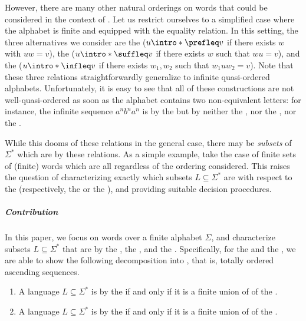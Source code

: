 \AP However, there are many other natural orderings on words that could be
considered in the context of . Let us restrict
ourselves to a simplified case where the alphabet is finite and equipped with
the equality relation. In this setting, the three alternatives we consider are
the  ($u \intro*\prefleq v$ if there exists $w$ with $uw
= v$), the  ($u \intro*\suffleq v$ if there exists $w$
such that $wu = v$), and the  ($u \intro*\infleq v$ if
there exists $w_1,w_2$ such that $w_1 u w_2 = v$). Note that these three
relations straightforwardly generalize to infinite quasi-ordered alphabets.
Unfortunately, it is easy to see that all of these constructions are not
well-quasi-ordered as soon as the alphabet contains two non-equivalent letters:
for instance, the infinite sequence $a^n b^n a^n$ is  by
the  but by neither the , nor the
, nor the .

\AP While this dooms  of these relations in the general case, there may be
\emph{subsets} of $\Sigma^*$ which are  by these
relations. As a simple example, take the case of finite sets of (finite) words
which are all  regardless of the ordering considered.
This raises the question of characterizing exactly which subsets $L \subseteq \Sigma^*$
are  with respect to the 
(respectively, the  or the ), and
providing suitable decision procedures.



\subparagraph{Contribution} In this paper, we focus on words over a finite
alphabet $\Sigma$, and characterize subsets $L \subseteq \Sigma^*$ that are
 by the , the ,
and the . Specifically, for the  and the , we are able to show the following decomposition into , that is, totally ordered ascending sequences.

{
\renewcommand{\labelenumi}{R\arabic{enumi}}
\begin{enumerate}
	\item A language $L \subseteq \Sigma^*$ is  by the  if and only if it is a finite union of  of the .
	\item A language $L \subseteq \Sigma^*$ is  by the  if and only if it is a finite union of  of the .
\end{enumerate}
}

